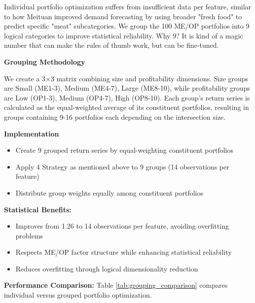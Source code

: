 \documentclass[12pt]{article}
\begin{document}
Individual portfolio optimization suffers from insufficient data per feature, similar to how Meituan improved demand forecasting by using broader "fresh food" to predict specific "meat" subcategories. We group the 100 ME/OP portfolios into 9 logical categories to improve statistical reliability. Why 9? It is kind of a magic number that can make the rules of thumb work, but can be fine-tuned.

\textbf{Grouping Methodology}

We create a 3×3 matrix combining size and profitability dimensions. Size groups are Small (ME1-3), Medium (ME4-7), Large (ME8-10), while profitability groups are Low (OP1-3), Medium (OP4-7), High (OP8-10). Each group's return series is calculated as the equal-weighted average of its constituent portfolios, resulting in groups containing 9-16 portfolios each depending on the intersection size.

\textbf{Implementation}
\begin{itemize}
    \item Create 9 grouped return series by equal-weighting constituent portfolios
    \item Apply 4 Strategy as mentioned above to 9 groups (14 observations per feature)
    \item Distribute group weights equally among constituent portfolios
\end{itemize}

\textbf{Statistical Benefits:}
\begin{itemize}
    \item Improves from 1.26 to 14 observations per feature, avoiding overfitting problems
    \item Respects ME/OP factor structure while enhancing statistical reliability
    \item Reduces overfitting through logical dimensionality reduction
\end{itemize}

\textbf{Performance Comparison:}
Table \ref{tab:grouping_comparison} compares individual versus grouped portfolio optimization.
\end{document}
